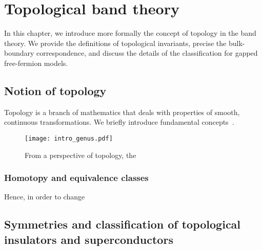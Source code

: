 \chapter{Topological band theory}
\label{ch:topo-intro}
In this chapter, we introduce more formally the concept of topology in the band theory. We provide the definitions of topological invariants, precise the bulk-boundary correspondence, and discuss the details of the classification for gapped free-fermion models.


\section{Notion of topology}
Topology is a branch of mathematics that deals with properties of smooth, continuous transformations.
We briefly introduce fundamental concepts~\cite{Nakahara}.

\begin{figure}[H]
\centering
\texttt{[image: intro\_genus.pdf]}
\caption{From a perspective of topology, the}
\end{figure}

\subsection{Homotopy and equivalence classes}




Hence, in order to change

%
%
%
%
%


\section{Symmetries and classification of topological insulators and superconductors}



